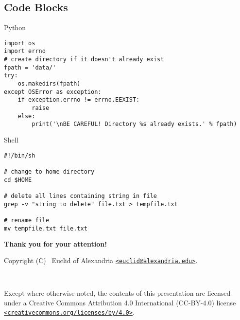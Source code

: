 \documentclass[aspectratio=169,xcolor={svgnames}]{beamer}
\begin{document}
\subsection{Code Blocks}
\begin{frame}{\insertsubsectionhead}
\begin{exampleblock}{Python}
\begin{lstlisting}[style=py]
import os
import errno
# create directory if it doesn't already exist
fpath = 'data/'
try:
    os.makedirs(fpath)
except OSError as exception:
    if exception.errno != errno.EEXIST:
        raise
    else:
        print('\nBE CAREFUL! Directory %s already exists.' % fpath)
\end{lstlisting}
\end{exampleblock}

\begin{exampleblock}{Shell}
\begin{lstlisting}[style=sh]
#!/bin/sh

# change to home directory
cd $HOME

# delete all lines containing string in file
grep -v "string to delete" file.txt > tempfile.txt

# rename file
mv tempfile.txt file.txt
\end{lstlisting}
\end{exampleblock}
\end{frame}

\appendix

\begin{frame}
  \textbf{\LARGE Thank you for your attention!}

  \vspace{16pt}
  Copyright (C) \the\year\ Euclid of Alexandria
  \href{mailto:euclid@alexandria.edu}{\texttt{<euclid@alexandria.edu>}}.

  \vspace{8pt}
  {\Huge\faCreativeCommons\ \faCreativeCommonsBy}

  Except where otherwise noted, the contents of this presentation are licensed
  under a Creative Commons Attribution 4.0 International (CC-BY-4.0) license
  \href{https://creativecommons.org/licenses/by/4.0/}
  {\texttt{<creativecommons.org/licenses/by/4.0>}}.
\end{frame}
\end{document}
